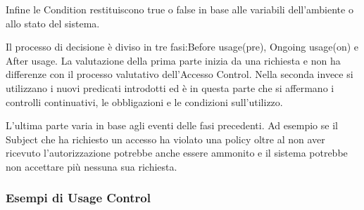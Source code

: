 Infine le Condition restituiscono true o false in base alle variabili dell'ambiente o allo stato del sistema.\par
Il processo di decisione è diviso in tre fasi\cite{SurveyUsageControl}:Before usage(pre), Ongoing usage(on) e After usage.
La valutazione della prima parte inizia da una richiesta e non ha differenze con il processo valutativo dell'Accesso Control.
Nella seconda invece si utilizzano i nuovi predicati introdotti ed è in questa parte che si affermano i controlli continuativi,
le obbligazioni e le condizioni sull'utilizzo.\par
L'ultima parte varia in base agli eventi delle fasi precedenti. Ad esempio se il Subject che ha richiesto un accesso ha violato
una policy oltre al non aver ricevuto l'autorizzazione potrebbe anche essere ammonito e il sistema potrebbe non accettare più
nessuna sua richiesta.

\subsubsection{Esempi di Usage Control}
\label{subs:Esempi}

